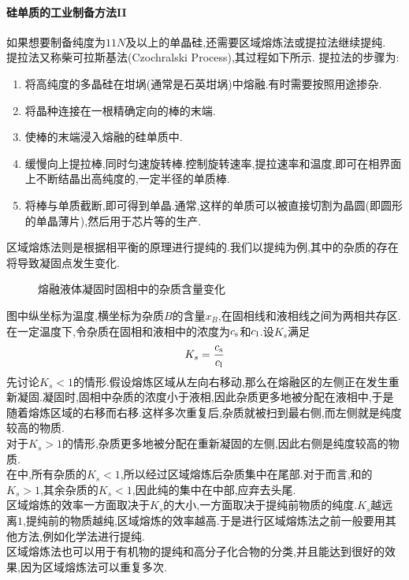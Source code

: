 \documentclass{ctexart}
\begin{document}
\paragraph{硅单质的工业制备方法II}
如果想要制备纯度为$11N$及以上的单晶硅,还需要区域熔炼法或提拉法继续提纯.\\
\indent 提拉法又称柴可拉斯基法(Czochralski Process),其过程如下所示.
提拉法的步骤为:
\begin{enumerate}[label=$\mathit{Step\ \arabic*.}$,topsep=0pt,parsep=0pt,itemsep=0pt,partopsep=0pt,leftmargin=*]
    \item 将高纯度的多晶硅在坩埚(通常是石英坩埚)中熔融.有时需要按照用途掺杂.
    \item 将晶种连接在一根精确定向的棒的末端.
    \item 使棒的末端浸入熔融的硅单质中.
    \item 缓慢向上提拉棒,同时匀速旋转棒.控制旋转速率,提拉速率和温度,即可在相界面上不断结晶出高纯度的,一定半径的单质棒.
    \item 将棒与单质截断,即可得到单晶.通常,这样的单质可以被直接切割为晶圆(即圆形的单晶薄片),然后用于芯片等的生产.
\end{enumerate}

\indent 区域熔炼法则是根据相平衡的原理进行提纯的.我们以提纯为例,其中的杂质的存在将导致凝固点发生变化.
\begin{figure}[H]
    \centering
    \caption{熔融液体凝固时固相中的杂质含量变化}
\end{figure}
图中纵坐标为温度,横坐标为杂质$B$的含量$x_B$,在固相线和液相线之间为两相共存区.在一定温度下,令杂质在固相和液相中的浓度为$c_{\text s}$和$c_{\text l}$.设$K_s$满足
\[K_s=\dfrac{c_{\text s}}{c_{\text l}}\]
\indent 先讨论$K_s<1$的情形.假设熔炼区域从左向右移动,那么在熔融区的左侧正在发生重新凝固.凝固时,固相中杂质的浓度小于液相,因此杂质更多地被分配在液相中,于是随着熔炼区域的右移而右移.这样多次重复后,杂质就被扫到最右侧,而左侧就是纯度较高的物质.\\
\indent 对于$K_s>1$的情形,杂质更多地被分配在重新凝固的左侧,因此右侧是纯度较高的物质.\\
\indent 在中,所有杂质的$K_s<1$,所以经过区域熔炼后杂质集中在尾部.对于而言,和的$K_s>1$,其余杂质的$K_s<1$,因此纯的集中在中部,应弃去头尾.\\
\indent 区域熔炼的效率一方面取决于$K_s$的大小,一方面取决于提纯前物质的纯度.$K_s$越远离$1$,提纯前的物质越纯,区域熔炼的效率越高.于是进行区域熔炼法之前一般要用其他方法,例如化学法进行提纯.\\
\indent 区域熔炼法也可以用于有机物的提纯和高分子化合物的分类,并且能达到很好的效果,因为区域熔炼法可以重复多次.
\end{document}
